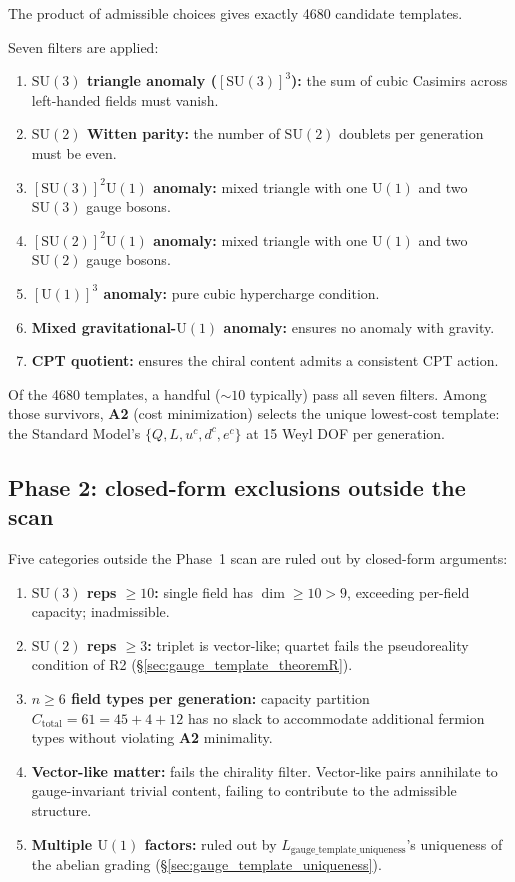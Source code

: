 \documentclass[11pt]{article}
\newcommand{\SU}{\mathrm{SU}}
\newcommand{\Un}{\mathrm{U}}
\newcommand{\Atwo}{\textbf{A2}}
\theoremstyle{definition}
\begin{document}
The product of admissible choices gives exactly 4680 candidate templates.

Seven filters are applied:

\begin{enumerate}
    \item \textbf{$\SU(3)$ triangle anomaly ($[\SU(3)]^3$):} the sum of cubic Casimirs across left-handed fields must vanish.
    \item \textbf{$\SU(2)$ Witten parity:} the number of $\SU(2)$ doublets per generation must be even.
    \item \textbf{$[\SU(3)]^2 \Un(1)$ anomaly:} mixed triangle with one $\Un(1)$ and two $\SU(3)$ gauge bosons.
    \item \textbf{$[\SU(2)]^2 \Un(1)$ anomaly:} mixed triangle with one $\Un(1)$ and two $\SU(2)$ gauge bosons.
    \item \textbf{$[\Un(1)]^3$ anomaly:} pure cubic hypercharge condition.
    \item \textbf{Mixed gravitational-$\Un(1)$ anomaly:} ensures no anomaly with gravity.
    \item \textbf{CPT quotient:} ensures the chiral content admits a consistent CPT action.
\end{enumerate}

Of the 4680 templates, a handful ($\sim 10$ typically) pass all seven filters. Among those survivors, \Atwo{} (cost minimization) selects the unique lowest-cost template: the Standard Model's $\{Q, L, u^c, d^c, e^c\}$ at 15 Weyl DOF per generation.

\subsection{Phase 2: closed-form exclusions outside the scan}\label{sec:4680_phase2}

Five categories outside the Phase~1 scan are ruled out by closed-form arguments:

\begin{enumerate}
    \item \textbf{$\SU(3)$ reps $\geq 10$:} single field has $\dim \geq 10 > 9$, exceeding per-field capacity; inadmissible.
    \item \textbf{$\SU(2)$ reps $\geq 3$:} triplet is vector-like; quartet fails the pseudoreality condition of R2 (\S\ref{sec:gauge_template_theoremR}).
    \item \textbf{$n \geq 6$ field types per generation:} capacity partition $C_{\mathrm{total}} = 61 = 45 + 4 + 12$ has no slack to accommodate additional fermion types without violating \Atwo{} minimality.
    \item \textbf{Vector-like matter:} fails the chirality filter. Vector-like pairs annihilate to gauge-invariant trivial content, failing to contribute to the admissible structure.
    \item \textbf{Multiple $\Un(1)$ factors:} ruled out by $L_{\mathrm{gauge\_template\_uniqueness}}$'s uniqueness of the abelian grading (\S\ref{sec:gauge_template_uniqueness}).
\end{enumerate}
\end{document}
